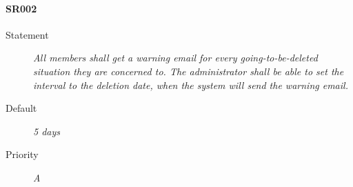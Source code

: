 \paragraph{SR002}
  \begin{description}
  \item [Statement] 
    \textit{ All members shall get a warning email for every going-to-be-deleted situation they are concerned to.
			The administrator shall be able to set the interval to the deletion date, when the system will send the warning email.}
  \item [Default] \textit{5 days}
  \item [Priority] \textit{A}
\end{description}
